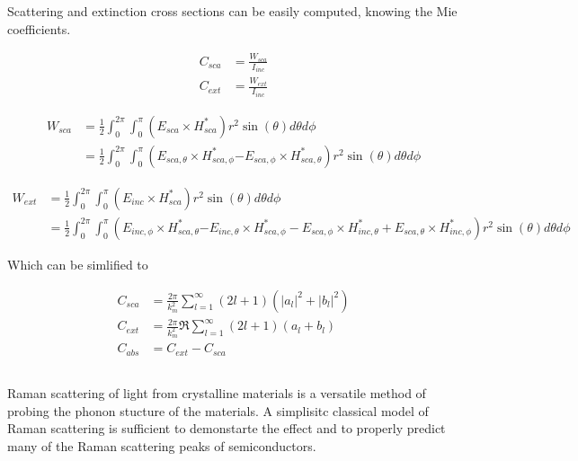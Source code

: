         \subsubsection{}
            Scattering and extinction cross sections can be easily computed, knowing the Mie coefficients.

            \begin{align}
                C_{sca} &= \frac{W_{sca}}{I_{inc}} \\
                C_{ext} &= \frac{W_{ext}}{I_{inc}}
            \end{align}

            \begin{align}
                W_{sca} &= \frac{1}{2}\int_0^{2\pi}\int_0^\pi \left(E_{sca} \times H^*_{sca}\right)r^2\sin(\theta)d\theta d\phi \\
                 &= \frac{1}{2}\int_0^{2\pi}\int_0^\pi \left(E_{sca,\theta} \times H^*_{sca,\phi}\right.
                                \left.- E_{sca,\phi} \times H^*_{sca,\theta}\right)r^2\sin(\theta)d\theta d\phi
            \end{align}

            \begin{align}
                W_{ext} &= \frac{1}{2}\int_0^{2\pi}\int_0^\pi \left(E_{inc} \times H^*_{sca}\right)r^2\sin(\theta)d\theta d\phi \\
                 &= \frac{1}{2}\int_0^{2\pi}\int_0^\pi \left(E_{inc,\phi} \times H^*_{sca,\theta}\right.
                                \left.- E_{inc,\theta} \times H^*_{sca,\phi} - E_{sca,\phi} \times H^*_{inc,\theta}
                                               + E_{sca,\theta} \times H^*_{inc,\phi}\right)r^2\sin(\theta)d\theta d\phi
            \end{align}

            Which can be simlified to

            \begin{align}
                C_{sca} &= \frac{2\pi}{k^2_m}\sum_{l=1}^\infty (2l +1)(|a_l|^2 + |b_l|^2)\\
                C_{ext} &= \frac{2\pi}{k^2_m}\Re\sum_{l=1}^\infty (2l +1)(a_l + b_l)\\
                C_{abs} &= C_{ext} - C_{sca}
            \end{align}

    \subsection{}
            Raman scattering of light from crystalline materials is a versatile method of probing the phonon stucture of the materials.
        A simplisitc classical model of Raman scattering is sufficient to demonstarte the effect and to properly predict many of the
        Raman scattering peaks of semiconductors\cite{peter2010fundamentals}.


